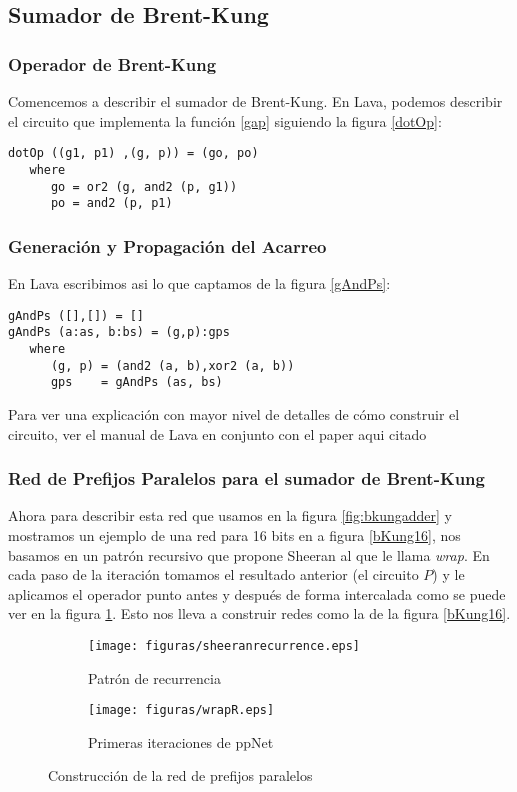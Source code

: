 \subsection{Sumador de Brent-Kung}
\subsubsection {Operador de Brent-Kung}
\noindent Comencemos a describir el sumador de Brent-Kung.
En Lava, podemos describir el circuito que implementa la función \ref{gap} siguiendo la figura \ref{dotOp}:

\begin{lstlisting}
dotOp ((g1, p1) ,(g, p)) = (go, po)
   where
      go = or2 (g, and2 (p, g1))
      po = and2 (p, p1)
\end{lstlisting}

\subsubsection {Generación y Propagación del Acarreo}
\noindent En Lava escribimos asi lo que captamos de la figura \ref{gAndPs}:
\lstset{language=Haskell}
{
\begin{lstlisting}
gAndPs ([],[]) = []
gAndPs (a:as, b:bs) = (g,p):gps
   where
      (g, p) = (and2 (a, b),xor2 (a, b))
      gps    = gAndPs (as, bs)
\end{lstlisting}
}


Para ver una explicación con mayor nivel de detalles de cómo construir el circuito, ver el manual de Lava \cite{Lava-tutorial} en conjunto con el paper aqui citado \cite{4638988}


\subsubsection {Red de Prefijos Paralelos para el sumador de Brent-Kung}
\noindent Ahora para describir esta red que usamos en la figura \ref{fig:bkungadder} y mostramos un ejemplo de una red para 16 bits en a figura \ref{bKung16}, nos basamos en un patrón recursivo que propone Sheeran \cite{Shee07} al que le llama \emph{wrap}. En cada paso de la iteración tomamos el resultado anterior (el circuito \(P\)) y le aplicamos el operador punto antes y después de forma intercalada como se puede ver en la figura \ref{sheeranrecurrence}. Esto nos lleva a construir redes como la de la figura \ref{bKung16}.


\begin{figure}[h!]
\centering
 \begin{subfigure}{0.3\textwidth}
    \centering
    \texttt{[image: figuras/sheeranrecurrence.eps]}
    \caption{Patrón de recurrencia}
    \label{sheeranrecurrence}
 \end{subfigure}
 \begin{subfigure}{0.4\textwidth}
    \centering
    \texttt{[image: figuras/wrapR.eps]}
    \caption{Primeras iteraciones de ppNet}
    \label{firstsiter}
 \end{subfigure}
 \caption{Construcción de la red de prefijos paralelos}
\end{figure}


